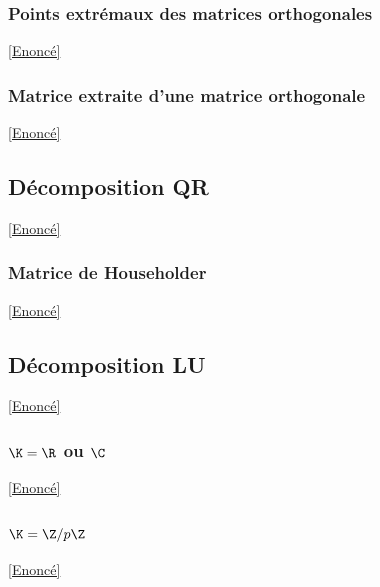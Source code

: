 \documentclass[8pt]{book}
\begin{document}
\begin{enumerate}[leftmargin=*]
\begin{enumerate}[label=\alph*.]
		\end{enumerate}
	\end{enumerate}
	
	\subsubsection{Points extrémaux des matrices orthogonales}
	\label{Points extrémaux des matrices orthogonales corrigé}
	\textcolor{blue}{\hyperref[Points extrémaux des matrices orthogonales]{[Enoncé]}}\\
	
	\subsubsection{Matrice extraite d'une matrice orthogonale}
	\label{Matrice extraite d'une matrice orthogonale corrigé}
	\textcolor{blue}{\hyperref[Matrice extraite d'une matrice orthogonale]{[Enoncé]}}\\
	
	\subsection{Décomposition QR}
	\label{Décomposition QR corrigé}
	\textcolor{blue}{\hyperref[Décomposition QR]{[Enoncé]}}\\
	
	\subsubsection{Matrice de Householder}
	\label{Matrice de Householder corrigé}
	\textcolor{blue}{\hyperref[Matrice de Householder]{[Enoncé]}}\\
	
	\subsection{Décomposition LU}
	\label{Décomposition LU corrigé}
	\textcolor{blue}{\hyperref[Décomposition LU]{[Enoncé]}}\\
	
	\subsubsection{$\K=\R$ ou $\C$} 
	\label{K=R ou C corrigé}
	\textcolor{blue}{\hyperref[K=R ou C]{[Enoncé]}}\\
	
	\subsubsection{$\K=\Z/p\Z$}
	\label{K=Z/pZ corrigé}
	\textcolor{blue}{\hyperref[K=Z/pZ]{[Enoncé]}}\\
	
\end{document}
